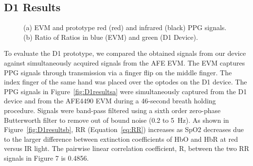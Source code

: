 \subsection{D1 Results}
\begin{figure}
    \begin{center}
    \end{center}
    \caption{(a) EVM and prototype red (red) and infrared (black) PPG signals. (b) Ratio of Ratios in blue (EVM) and green (D1 Device).} 
    \label{fig:D1results}
\end{figure}
To evaluate the D1 prototype, we compared the obtained signals from our device against simultaneously acquired signals from the AFE EVM. The EVM captures PPG signals through transmission via a finger flip on the middle finger. The index finger of the same hand was placed over the optodes on the D1 device. The PPG signals in Figure~\ref{fig:D1resultsa} were simultaneously captured from the D1 device and from the AFE4490 EVM during a 46-second breath holding procedure. Signals were band-pass filtered using a sixth order zero-phase Butterworth filter to remove out of bound noise (0.2 to 5~Hz). As shown in Figure~\ref{fig:D1resultsb}, RR (Equation~\ref{eq:RR}) increases as SpO2 decreases due to the larger difference between extinction coefficients of HbO and HbR at red versus IR light. The pairwise linear correlation coefficient, R, between the two RR signals in Figure 7 is 0.4856. 



